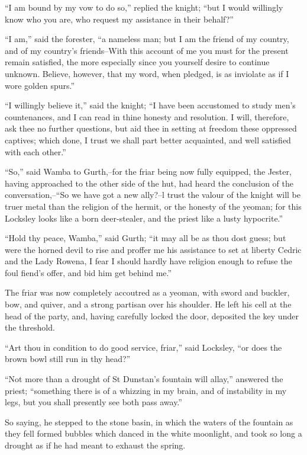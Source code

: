 ``I am bound by my vow to do so,'' replied the knight; ``but I would
willingly know who you are, who request my assistance in their behalf?''

``I am,'' said the forester, ``a nameless man; but I am the friend of my
country, and of my country's friends--With this account of me you must
for the present remain satisfied, the more especially since you yourself
desire to continue unknown. Believe, however, that my word, when
pledged, is as inviolate as if I wore golden spurs.''

``I willingly believe it,'' said the knight; ``I have been accustomed to
study men's countenances, and I can read in thine honesty and
resolution. I will, therefore, ask thee no further questions, but aid
thee in setting at freedom these oppressed captives; which done, I trust
we shall part better acquainted, and well satisfied with each other.''

``So,'' said Wamba to Gurth,--for the friar being now fully equipped,
the Jester, having approached to the other side of the hut, had heard
the conclusion of the conversation,--``So we have got a new ally?--l
trust the valour of the knight will be truer metal than the religion of
the hermit, or the honesty of the yeoman; for this Locksley looks like a
born deer-stealer, and the priest like a lusty hypocrite.''

``Hold thy peace, Wamba,'' said Gurth; ``it may all be as thou dost
guess; but were the horned devil to rise and proffer me his assistance
to set at liberty Cedric and the Lady Rowena, I fear I should hardly
have religion enough to refuse the foul fiend's offer, and bid him get
behind me.''

The friar was now completely accoutred as a yeoman, with sword and
buckler, bow, and quiver, and a strong partisan over his shoulder. He
left his cell at the head of the party, and, having carefully locked the
door, deposited the key under the threshold.

``Art thou in condition to do good service, friar,'' said Locksley, ``or
does the brown bowl still run in thy head?''

``Not more than a drought of St Dunstan's fountain will allay,''
answered the priest; ``something there is of a whizzing in my brain, and
of instability in my legs, but you shall presently see both pass away.''

So saying, he stepped to the stone basin, in which the waters of the
fountain as they fell formed bubbles which danced in the white
moonlight, and took so long a drought as if he had meant to exhaust the
spring.

